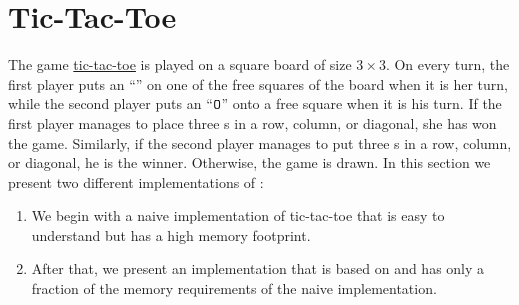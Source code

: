 \section{Tic-Tac-Toe}
The game \href{https://en.wikipedia.org/wiki/Tic-tac-toe}{tic-tac-toe} is played on a square board of size 
$3 \times 3$.  On every turn, the first player puts an ``'' on one of the free squares of the board
when it is her turn, while
the second player puts an ``$\texttt{O}$'' onto a free square when it is his turn.  If the first player manages
to place three s in a row, column, or diagonal, she has won the game.  Similarly, if the second
player manages to put three s in a row, column, or diagonal, he is the winner.  Otherwise,
the game is drawn.  In this section we present two different implementations of :
\begin{enumerate}
\item We begin with a naive implementation of tic-tac-toe that is easy to understand but has a high memory
      footprint.
\item After that, we present an implementation that is based on  and has only a fraction of the
      memory requirements of the naive implementation.  
\end{enumerate}

